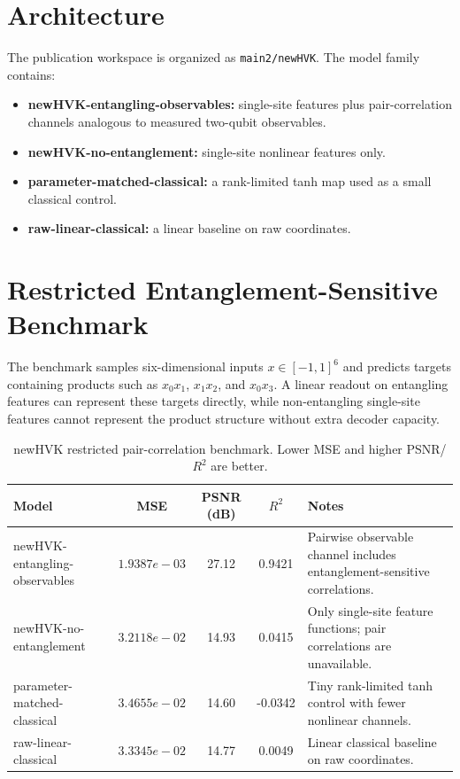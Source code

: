 \documentclass[journal]{IEEEtran}
\begin{document}
\section{Architecture}
The publication workspace is organized as \texttt{main2/newHVK}. The model family contains:
\begin{itemize}
\item \textbf{newHVK-entangling-observables:} single-site features plus pair-correlation channels analogous to measured two-qubit observables.
\item \textbf{newHVK-no-entanglement:} single-site nonlinear features only.
\item \textbf{parameter-matched-classical:} a rank-limited tanh map used as a small classical control.
\item \textbf{raw-linear-classical:} a linear baseline on raw coordinates.
\end{itemize}

\section{Restricted Entanglement-Sensitive Benchmark}
The benchmark samples six-dimensional inputs $x\in[-1,1]^6$ and predicts targets containing products such as $x_0x_1$, $x_1x_2$, and $x_0x_3$. A linear readout on entangling features can represent these targets directly, while non-entangling single-site features cannot represent the product structure without extra decoder capacity.

\begin{table}[t]
\centering
\caption{newHVK restricted pair-correlation benchmark. Lower MSE and higher PSNR/$R^2$ are better.}
\label{tab:newhvk_restricted}
\scriptsize
\begin{tabular}{lcccp{}}
\toprule
Model & MSE & PSNR (dB) & $R^2$ & Notes \\
\midrule
newHVK-entangling-observables & $1.9387e-03$ & 27.12 & 0.9421 & Pairwise observable channel includes entanglement-sensitive correlations. \\
newHVK-no-entanglement & $3.2118e-02$ & 14.93 & 0.0415 & Only single-site feature functions; pair correlations are unavailable. \\
parameter-matched-classical & $3.4655e-02$ & 14.60 & -0.0342 & Tiny rank-limited tanh control with fewer nonlinear channels. \\
raw-linear-classical & $3.3345e-02$ & 14.77 & 0.0049 & Linear classical baseline on raw coordinates. \\
\bottomrule
\end{tabular}
\end{table}
\end{document}
